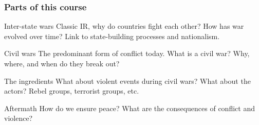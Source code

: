 \documentclass[aspectratio=43]{beamer}
\begin{document}
\begin{frame}
\frametitle{Parts of this course}
\centering


\begin{block}{Inter-state wars}
Classic IR, why do countries fight each other? How has war evolved over time? Link to state-building processes and nationalism.
\end{block}

\begin{block}{Civil wars}
The predominant form of conflict today. What is a civil war? Why, where, and when do they break out?
\end{block}

\hline

\begin{block}{The ingredients}
What about violent events during civil wars? What about the actors? Rebel groups, terrorist groups, etc.
\end{block}

\begin{block}{Aftermath}
How do we ensure peace? What are the consequences of conflict and violence?
\end{block}

\end{frame}
%
%
%
\end{document}
